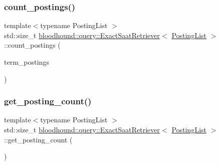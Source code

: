 \subsubsection{\texorpdfstring{count\+\_\+postings()}{count\_postings()}}
{\footnotesize\ttfamily template$<$typename Posting\+List $>$ \\
std\+::size\+\_\+t \hyperlink{classbloodhound_1_1query_1_1ExactSaatRetriever}{bloodhound\+::query\+::\+Exact\+Saat\+Retriever}$<$ \hyperlink{classbloodhound_1_1PostingList}{Posting\+List} $>$\+::count\+\_\+postings (\begin{DoxyParamCaption}\item[{const std\+::vector$<$ \hyperlink{classbloodhound_1_1PostingList}{Posting\+List} $>$ \&}]{term\+\_\+postings }\end{DoxyParamCaption})\hspace{0.3cm}{\ttfamily [inline]}}

\mbox{\label{classbloodhound_1_1query_1_1ExactSaatRetriever_a43b6bd8cdc3a64c5eabf778230c53419}} 
\subsubsection{\texorpdfstring{get\+\_\+posting\+\_\+count()}{get\_posting\_count()}}
{\footnotesize\ttfamily template$<$typename Posting\+List $>$ \\
std\+::size\+\_\+t \hyperlink{classbloodhound_1_1query_1_1ExactSaatRetriever}{bloodhound\+::query\+::\+Exact\+Saat\+Retriever}$<$ \hyperlink{classbloodhound_1_1PostingList}{Posting\+List} $>$\+::get\+\_\+posting\+\_\+count (\begin{DoxyParamCaption}{ }\end{DoxyParamCaption})\hspace{0.3cm}{\ttfamily [inline]}}

\mbox{\label{classbloodhound_1_1query_1_1ExactSaatRetriever_a5d3a882f8f117130a4be46e711397e3c}} 
